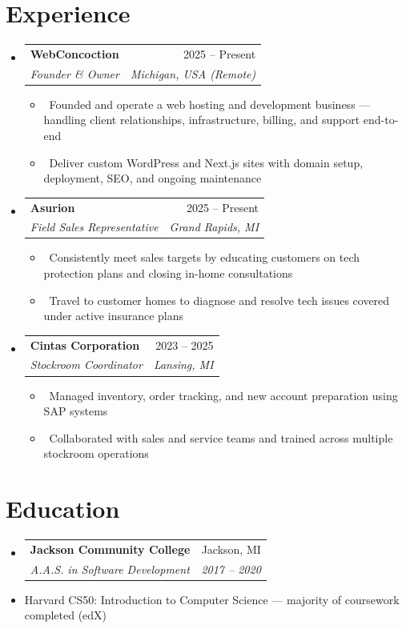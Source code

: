 \documentclass[letterpaper,10pt]{article}
\makeatletter
\newcommand{\resumeItem}[1]{\item \small{#1}}
\newcommand{\resumeSubheading}[4]{
\vspace{-2pt}\item
  \begin{tabular*}{0.97\textwidth}[t]{l@{\extracolsep{\fill}}r}
    \textbf{#1} & \small #2 \\
    \textit{\small #3} & \textit{\small #4} \\
  \end{tabular*}\vspace{-6pt}
}
\newcommand{\resumeSubHeadingList}{\begin{itemize}[leftmargin=0.15in, label={}, itemsep=-2pt]}
\newcommand{\resumeSubHeadingListEnd}{\end{itemize}}
\makeatother
\begin{document}
\section{Experience}
\resumeSubHeadingList

  \resumeSubheading
    {WebConcoction}{2025 -- Present}
    {Founder \& Owner}{Michigan, USA (Remote)}
    \resumeSubHeadingList
      \resumeItem{\textbullet\ Founded and operate a web hosting and development business — handling client relationships, infrastructure, billing, and support end-to-end}
      \resumeItem{\textbullet\ Deliver custom WordPress and Next.js sites with domain setup, deployment, SEO, and ongoing maintenance}
    \resumeSubHeadingListEnd

  \resumeSubheading
    {Asurion}{2025 -- Present}
    {Field Sales Representative}{Grand Rapids, MI}
    \resumeSubHeadingList
      \resumeItem{\textbullet\ Consistently meet sales targets by educating customers on tech protection plans and closing in-home consultations}
      \resumeItem{\textbullet\ Travel to customer homes to diagnose and resolve tech issues covered under active insurance plans}
    \resumeSubHeadingListEnd

  \resumeSubheading
    {Cintas Corporation}{2023 -- 2025}
    {Stockroom Coordinator}{Lansing, MI}
    \resumeSubHeadingList
      \resumeItem{\textbullet\ Managed inventory, order tracking, and new account preparation using SAP systems}
      \resumeItem{\textbullet\ Collaborated with sales and service teams and trained across multiple stockroom operations}
    \resumeSubHeadingListEnd

\resumeSubHeadingListEnd

\vspace{-2pt}

\section{Education}
\resumeSubHeadingList
  \resumeSubheading
    {Jackson Community College}{Jackson, MI}
    {A.A.S. in Software Development}{2017 -- 2020}
  \vspace{2pt}
  \resumeItem{\small Harvard CS50: Introduction to Computer Science — majority of coursework completed (edX)}
\resumeSubHeadingListEnd
\end{document}

